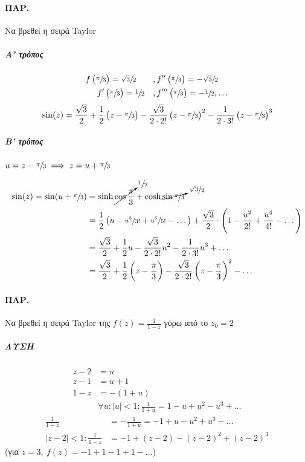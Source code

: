 \documentclass[12pt,a4paper,titlepage,fleqn]{article}
\begin{document}
  \paragraph{ΠΑΡ.}
  Να βρεθεί η σειρά Taylor
  \subparagraph{Α' τρόπος}
  \begin{align*}
  f\left(\sfrac{\pi}{3} \right) = \sfrac{\sqrt{3}}{2} \qquad &,
  f''\left(\sfrac{\pi}{3} \right) = -\sfrac{\sqrt{3}}{2} \\
  f'\left(\sfrac{\pi}{3} \right) = \sfrac{1}{2} \quad &,
  f'''\left(\sfrac{\pi}{3} \right) = -\sfrac{1}{2},\dots\end{align*}\[
  \\ \sin(z)=\frac{\sqrt{3}}{2}+\frac{1}{2}\left(z-\sfrac{\pi}{3} \right)
  -\frac{\sqrt{3}}{2\cdot 2!} \left(z-\sfrac{\pi}{3} \right)^2
  -\frac{1}{2\cdot 3!}\left( z-\sfrac{\pi}{3}  \right)^3
  \]
  \subparagraph{Β' τρόπος}
  \( u = z-\sfrac{\pi}{3} \implies z=u+\sfrac{\pi}{3}   \)
  
  \begin{align*}
  \sin(z) = \sin(u+\sfrac{\pi}{3} ) &=
  \sinh \cancelto{\sfrac{1}{2} }{\cos\frac{\pi}{3}}
  +\cosh \cancelto{\sfrac{\sqrt{3}}{2} }{\sin\sfrac{\pi}{3}}
  \\ &= \frac{1}{2}\left(
  u-\sfrac{u^3}{3!} +\sfrac{u^5}{5!} -\dots
  \right) + \frac{\sqrt{3}}{2} \cdot \left(
  1-\frac{u^2}{2!} + \frac{u^4}{4!} - \dots
  \right)
  \\ &= \frac{\sqrt{3}}{2} + \frac{1}{2}u-\frac{\sqrt{3}}{2\cdot 2!}u^2
  -\frac{1}{2\cdot 3!}u^3+\dots
  \\ &= \frac{\sqrt{3}}{2}+\frac{1}{2}\left( z-\frac{\pi}{3} \right)
  -\frac{\sqrt{3}}{2\cdot 2!} \left( z-\frac{\pi}{3} \right)^2 - \dots
  \end{align*}
  
  \paragraph{ΠΑΡ.}
  Να βρεθεί η σειρά Taylor της \( f(z) = \frac{1}{1-z} \) γύρω από το \( z_0 = 2 \)
  \subparagraph{ΛΥΣΗ}
  \begin{align*}
  z-2 &= u \\
  z-1 &= u+ 1 \\
  1-z &= -(1+u) \\
  & \forall u:|u|<1:\frac{1}{1+u} = 1-u+u^2-u^3+\dots
  \end{align*}
  \begin{align*}
  \frac{1}{1-z} &= - \frac{1}{1+u} = -1+u-u^2+u^3-\dots \\
  |z-2| < 1 : \frac{1}{1-z} &= -1 + (z-2) - (z-2)^2 + (z-2)^3
  \end{align*}
  (για \( z=3,\ f(z)=-1+1-1+1-\dots \))
  
\end{document}
